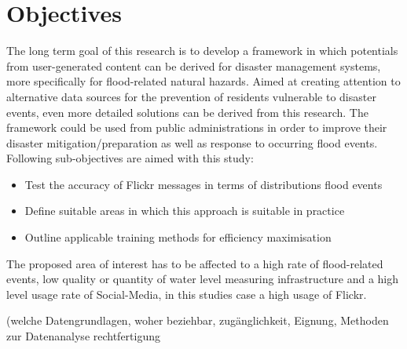 \section{Objectives}

The long term goal of this research is to develop a framework in which potentials from user-generated content can be derived for disaster management systems, more specifically for flood-related natural hazards. Aimed at creating attention to alternative data sources for the prevention of residents vulnerable to disaster events, even more detailed solutions can be derived from this research. The framework could be used from public administrations in order to improve their disaster mitigation/preparation as well as response to occurring flood events. Following sub-objectives are aimed with this study:

\begin{itemize}
 \item Test the accuracy of Flickr messages in terms of distributions flood events
 \item Define suitable areas in which this approach is suitable in practice 
 \item Outline applicable training methods for efficiency maximisation
 \end{itemize} 

The proposed area of interest has to be affected to a high rate of flood-related events, low quality or quantity of water level measuring infrastructure and a high level usage rate of Social-Media, in this studies case a high usage of Flickr.

 (welche Datengrundlagen, woher beziehbar, zugänglichkeit, Eignung, Methoden zur Datenanalyse rechtfertigung
 